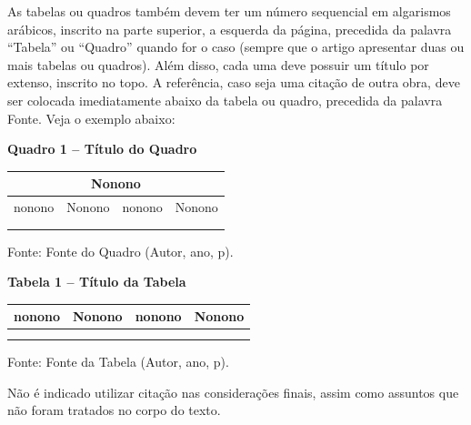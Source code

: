 \bigskip
As tabelas ou quadros também devem ter um número sequencial em algarismos arábicos, inscrito na parte superior, a esquerda da página, precedida da palavra ``Tabela'' ou ``Quadro'' quando for o caso (sempre que o artigo apresentar duas ou mais tabelas ou quadros). Além disso, cada uma deve possuir um título por extenso, inscrito no topo. A referência, caso seja uma citação de outra obra, deve ser colocada imediatamente abaixo da tabela ou quadro, precedida da palavra Fonte. Veja o exemplo abaixo:

\bigskip
\noindent\hspace*{1.25cm}\textbf{Quadro 1 -- Título do Quadro}

\medskip
\begin{center}
\begin{tabular}{|p{3cm}|p{3cm}|p{3cm}|p{3cm}|}
\hline
\multicolumn{4}{|c|}{Nonono} \\
\hline
nonono & Nonono & nonono & Nonono \\
\hline
 & & & \\
\hline
 & & & \\
\hline
\end{tabular}
\end{center}

\medskip
\noindent Fonte: Fonte do Quadro (Autor, ano, p).

\bigskip
\noindent\hspace*{1.25cm}\textbf{Tabela 1 -- Título da Tabela}

\medskip
\begin{center}
\begin{tabular}{cccc}
\toprule
nonono & Nonono & nonono & Nonono \\
\midrule
 & & & \\
\midrule
 & & & \\
\bottomrule
\end{tabular}
\end{center}

\medskip
\noindent Fonte: Fonte da Tabela (Autor, ano, p).

\bigskip

\medskip
Não é indicado utilizar citação nas considerações finais, assim como assuntos que não foram tratados no corpo do texto.


